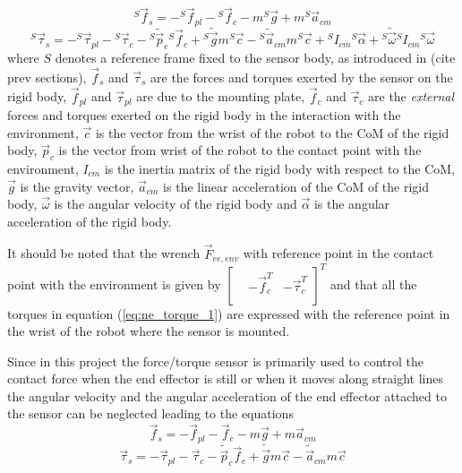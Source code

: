 \begin{equation}
  {}^S \vec{f}_{s} = -{}^S \vec{f}_{pl} -{}^S \vec{f}_{c} -m {}^S \vec{g} + m {}^S \vec{a}_{cm}
\end{equation}
\begin{equation}
  \label{eq:ne_torque_1}
  {}^S \vec{\tau}_{s} = -{}^S \vec{\tau}_{pl} -{}^S \vec{\tau}_{c} -{}^S \tilde{\vec{p}}_{c} {}^S \vec{f}_{c}
  +{}^S \tilde{\vec{g}} m{}^S\vec{c} - {}^S \tilde{\vec{a}}_{cm} m {}^S \vec{c} + {}^S I_{cm} {}^S\vec{\alpha} 
  +{}^S \tilde{\vec{\omega}} {}^S I_{cm} {}^S \vec{\omega}
\end{equation}
where $S$ denotes a reference frame fixed to the sensor body, as introduced in (cite prev sections),
$\vec{f}_{s}$ and $\vec{\tau}_{s}$ are the forces and torques exerted by the sensor on the rigid body,
$\vec{f}_{pl}$ and $\vec{\tau}_{pl}$ are due to the mounting plate,
$\vec{f}_{c}$ and $\vec{\tau}_{c}$ are the \emph{external} forces and torques exerted on the rigid body in the interaction
with the environment,
$\vec{c}$ is the vector from the wrist of the robot to the CoM of the rigid body,
$\vec{p}_{c}$ is the vector from wrist of the robot to the contact point with the environment,
$I_{cm}$ is the inertia matrix of the rigid body with respect to the CoM,
$\vec{g}$ is the gravity vector, $\vec{a}_{cm}$ is the linear acceleration of the CoM of the rigid body,
$\vec{\omega}$ is the angular velocity of the rigid body and
$\vec{\alpha}$ is the angular acceleration of the rigid body.
\par
It should be noted that the wrench $\vec{F}_{ee,env}$ with reference point in the contact point with the environment is given by
$\begin{bmatrix}
  & -\vec{f}_{c} ^T & - \vec{\tau}_{c} ^ T \\
\end{bmatrix}^T$
and that all the torques in equation (\ref{eq:ne_torque_1}) are expressed with the reference point in the wrist
of the robot where the sensor is mounted.
\par
Since in this project the force/torque sensor is primarily used to control the contact force when the end effector
is still or when it moves along straight lines the angular velocity and the angular acceleration of the end effector
attached to the sensor can be neglected leading to the equations
\begin{equation}
  \label{eq:ne_force_2}
   \vec{f}_{s} = - \vec{f}_{pl} - \vec{f}_{c} -m  \vec{g} + m  \vec{a}_{cm}
\end{equation}
\begin{equation}
  \label{eq:ne_torque_2}
   \vec{\tau}_{s} = - \vec{\tau}_{pl} - \vec{\tau}_{c} - \tilde{\vec{p}}_{c}  \vec{f}_{c}
   + \tilde{\vec{g}} m\vec{c} -  \tilde{\vec{a}}_{cm} m  \vec{c}
\end{equation}


